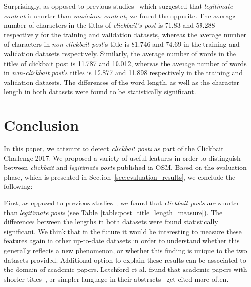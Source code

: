 \documentclass{sig-alternate}
\begin{document}
Surprisingly, as opposed to previous studies~\cite{chakraborty2016stop,horne2017just} which suggested that \emph{legitimate content} is shorter than \emph{malicious content}, we found the opposite. 
The average number of characters in the titles of \emph{clickbait's post} is 71.83 and 59.288 respectively for the training and validation datasets, whereas the average number of characters in \emph{non-clickbait post}'s title is 81.746 and 74.69 in the training and validation datasets respectively.
Similarly, the average number of words in the titles of clickbait post is 11.787 and 10.012, whereas the average number of words in \emph{non-clickbait post}'s titles is 12.877 and 11.898 respectively in the training and validation datasets.
The differences of the word length, as well as the character length in both datasets were found to be statistically significant. 

\section{Conclusion}
\label{sec:conclusion}
In this paper, we attempt to detect \emph{clickbait posts} as part of the Clickbait Challenge 2017.
We proposed a variety of useful features in order to distinguish between \emph{clickbait} and \emph{legitimate posts} published in OSM.
Based on the evaluation phase, which is presented in Section~\ref{sec:evaluation_results}, we conclude the following:

First, as opposed to previous studies~\cite{chakraborty2016stop,horne2017just}, we found that \emph{clickbait posts} are shorter than \emph{legitimate posts} (see Table~\ref{table:post_title_length_measure}).
The differences between the lengths in both datasets were found statistically significant.
We think that in the future it would be interesting to measure these features again in other up-to-date datasets in order to understand whether this generally reflects a new phenomenon, or whether this finding is unique to the two datasets provided.   
Additional option to explain these results can be associated to the domain of academic papers. 
Letchford et al. found that academic papers with shorter titles~\cite{letchford2016advantage}, or simpler language in their abstracts~\cite{letchford2015advantage} get cited more often.  
\end{document}
